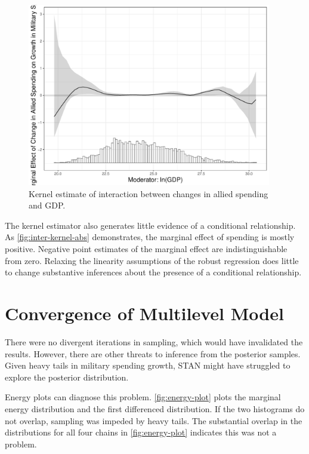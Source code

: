 \documentclass[12pt]{article}
\begin{document}
\begin{figure}
	\centering
		\includegraphics[width=0.95\textwidth]{inter-kernel-abs.pdf}
	\caption{Kernel estimate of interaction between changes in allied spending and GDP.}
	\label{fig:inter-kernel-abs}
\end{figure}


The kernel estimator also generates little evidence of a conditional relationship. 
As \autoref{fig:inter-kernel-abs} demonstrates, the marginal effect of spending is mostly positive. 
Negative point estimates of the marginal effect are indistinguishable from zero. 
Relaxing the linearity assumptions of the robust regression does little to change substantive inferences about the presence of a conditional relationship. 




\section{Convergence of Multilevel Model} 


There were no divergent iterations in sampling, which would have invalidated the results. 
However, there are other threats to inference from the posterior samples. 
Given heavy tails in military spending growth, STAN might have struggled to explore the posterior distribution. 


Energy plots can diagnose this problem. 
\autoref{fig:energy-plot} plots the marginal energy distribution and the first differenced distribution. 
If the two histograms do not overlap, sampling was impeded by heavy tails. 
The substantial overlap in the distributions for all four chains in \autoref{fig:energy-plot} indicates this was not a problem. 
\end{document}
